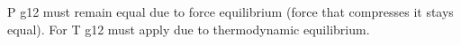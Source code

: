 P g12 must remain equal due to force equilibrium (force that compresses it stays equal).  
For T g12 must apply due to thermodynamic equilibrium.